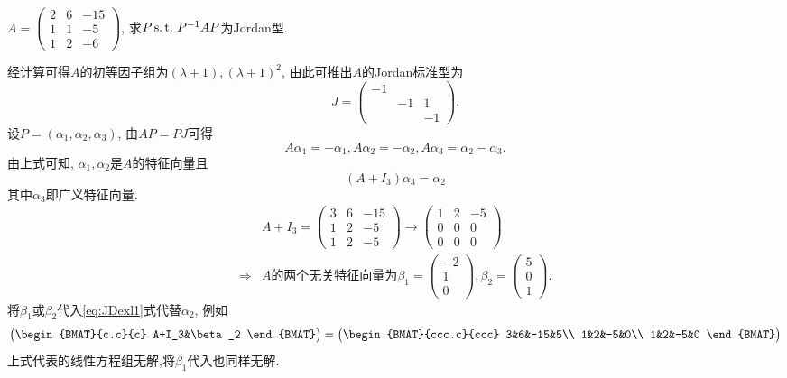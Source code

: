 \begin{example}\label{exl:JDexl1}
  $A=
  \begin{pmatrix}
    2&6&-15\\
    1&1&-5\\
    1&2&-6
  \end{pmatrix}$,
  求$P \operatorname{s.t.{}} P^{-1}AP$为Jordan型.
\end{example}

\begin{solution}
  经计算可得$A$的初等因子组为$(\lambda+1), (\lambda+1)^2$,
  由此可推出$A$的Jordan标准型为
  \[ J=
    \begin{pmatrix}
      -1&&\\
        &-1&1\\
      &&-1
    \end{pmatrix}. \]
  设$P=(\alpha_1, \alpha_2, \alpha_3)$,
  由$AP=PJ$可得
  \[ A\alpha_1=-\alpha_1, A\alpha_2=-\alpha_2, A\alpha_3=\alpha_2-\alpha_3.\]
  由上式可知,
  $\alpha_1, \alpha_2$是$A$的特征向量且
  \begin{equation}\label{eq:JDexl1}
    (A+I_3)\alpha_3=\alpha_2
  \end{equation}
  其中$\alpha_3$即广义特征向量.
  \begin{align*}
    & A+I_3=
    \begin{pmatrix}
      3&6&-15\\
      1&2&-5\\
      1&2&-5
    \end{pmatrix} \longrightarrow
    \begin{pmatrix}
      1&2&-5\\
      0&0&0\\
      0&0&0
    \end{pmatrix}\\
    \Longrightarrow & A\text{的两个无关特征向量为}
    \beta_1=
    \begin{pmatrix}
      -2\\
      1\\
      0
    \end{pmatrix}, \beta_2=
    \begin{pmatrix}
      5\\
      0\\
      1
    \end{pmatrix}.
  \end{align*}
  将$\beta_1$或$\beta_2$代入\eqref{eq:JDexl1}式代替$\alpha_2$,
  例如
  \[
    \begin{pmatrix}
      \begin{BMAT}{c.c}{c}
        A+I_3&\beta_2
      \end{BMAT}
    \end{pmatrix}=
    \begin{pmatrix}
      \begin{BMAT}{ccc.c}{ccc}
        3&6&-15&5\\
        1&2&-5&0\\
        1&2&-5&0
      \end{BMAT}
    \end{pmatrix}
  \]
  上式代表的线性方程组无解,将$\beta_1$代入也同样无解.


\end{solution}
